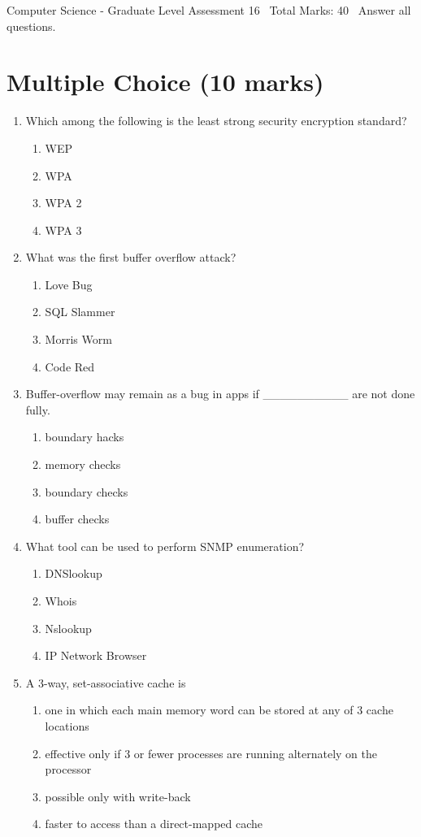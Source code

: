 \documentclass[12pt]{article}
\begin{document}
\begin{center}
Computer Science - Graduate Level Assessment 16 \
Total Marks: 40 \
Answer all questions.
\end{center}

\section*{Multiple Choice (10 marks)}
\begin{enumerate}[label=\arabic*.]
\item Which among the following is the least strong security encryption standard?
\begin{enumerate}[label=(\alph*)]
    \item WEP
    \item WPA
    \item WPA 2
    \item WPA 3
\end{enumerate}
\item What was the first buffer overflow attack?
\begin{enumerate}[label=(\alph*)]
    \item Love Bug
    \item SQL Slammer
    \item Morris Worm
    \item Code Red
\end{enumerate}
\item Buffer-overflow may remain as a bug in apps if \_\_\_\_\_\_\_\_\_\_ are not done fully.
\begin{enumerate}[label=(\alph*)]
    \item boundary hacks
    \item memory checks
    \item boundary checks
    \item buffer checks
\end{enumerate}
\item What tool can be used to perform SNMP enumeration?
\begin{enumerate}[label=(\alph*)]
    \item DNSlookup
    \item Whois
    \item Nslookup
    \item IP Network Browser
\end{enumerate}
\item A 3-way, set-associative cache is
\begin{enumerate}[label=(\alph*)]
    \item one in which each main memory word can be stored at any of 3 cache locations
    \item effective only if 3 or fewer processes are running alternately on the processor
    \item possible only with write-back
    \item faster to access than a direct-mapped cache
\end{enumerate}
\end{enumerate}
\end{document}
